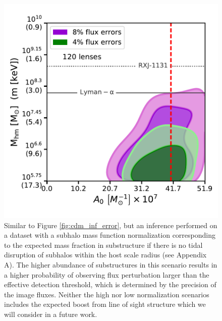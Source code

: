 \begin{figure}
	\centering
	\includegraphics[clip,trim=0cm .5cm .3cm
	.5cm,width=.75\textwidth,keepaspectratio]{./figures_ABCforward/joint_120_4_8_errors_HN.pdf}
	\caption{\label{fig:cdm_inf_error_highnorm} Similar to Figure \ref{fig:cdm_inf_error}, but an inference performed on a dataset with a subhalo mass function normalization corresponding to the expected mass fraction in substructure if there is no tidal disruption of subhalos within the host scale radius (see Appendix A). The higher abundance of substructures in this scenario results in a higher probability of observing flux perturbation larger than the effective detection threshold, which is determined by the precision of the image fluxes. Neither the high nor low normalization scenarios includes the expected boost from line of sight structure which we will consider in a future work.}
\end{figure}

